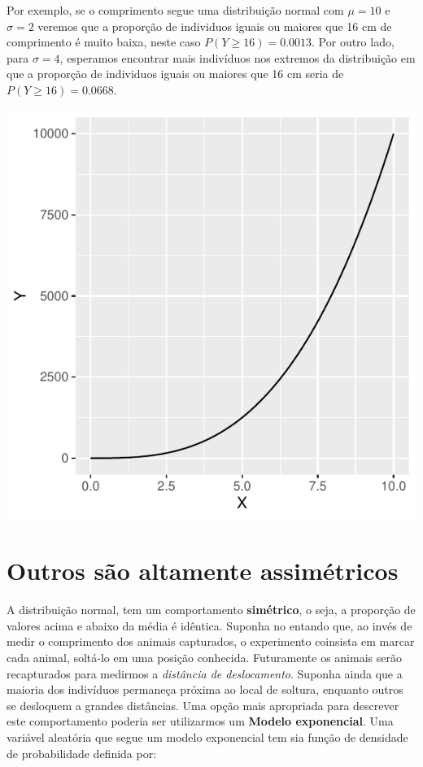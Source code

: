\documentclass[
]{book}
\begin{document}
Por exemplo, se o comprimento segue uma distribuição normal com \(\mu = 10\) e \(\sigma = 2\) veremos que a proporção de individuos iguais ou maiores que 16 cm de comprimento é muito baixa, neste caso \(P(Y \ge 16) = 0.0013\). Por outro lado, para \(\sigma = 4\), esperamos encontrar mais indivíduos nos extremos da distribuição em que a proporção de individuos iguais ou maiores que 16 cm seria de \(P(Y \ge 16) = 0.0668\).

\begin{center}\includegraphics{probest-cambientais_files/figure-latex/unnamed-chunk-214-1} \end{center}

\hypertarget{outros-suxe3o-altamente-assimuxe9tricos}{%
\section{Outros são altamente assimétricos}\label{outros-suxe3o-altamente-assimuxe9tricos}}

A distribuição normal, tem um comportamento \textbf{simétrico}, o seja, a proporção de valores acima e abaixo da média é idêntica. Suponha no entando que, ao invés de medir o comprimento dos animais capturados, o experimento coinsista em marcar cada animal, soltá-lo em uma posição conhecida. Futuramente os animais serão recapturados para medirmos a \emph{distância de deslocamento}. Suponha ainda que a maioria dos indivíduos permaneça próxima ao local de soltura, enquanto outros se desloquem a grandes distâncias. Uma opção mais apropriada para descrever este comportamento poderia ser utilizarmos um \textbf{Modelo exponencial}. Uma variável aleatória que segue um modelo exponencial tem sia função de densidade de probabilidade definida por:
\end{document}
